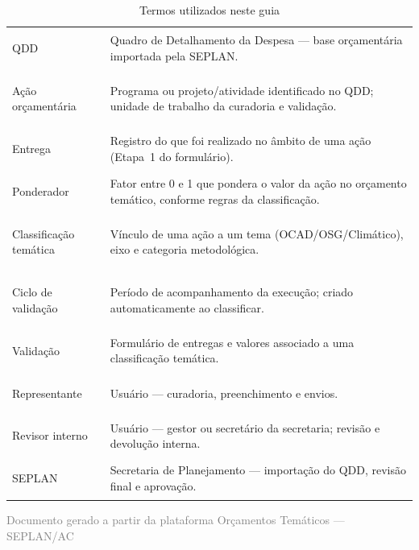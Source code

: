 \documentclass[11pt,a4paper]{article}
\begin{document}
\begin{table}[htbp]
  \centering
  \guiaTableStretch
  \caption{Termos utilizados neste guia}
  \begin{tabularx}{\textwidth}{@{}>{\bfseries\raggedright\arraybackslash}p{4.6cm} Y@{}}
    \toprule
    QDD & Quadro de Detalhamento da Despesa --- base orçamentária importada pela SEPLAN. \\
    Ação orçamentária & Programa ou projeto/atividade identificado no QDD; unidade de trabalho da curadoria e validação. \\
    Entrega & Registro do que foi realizado no âmbito de uma ação (Etapa~1 do formulário). \\
    Ponderador & Fator entre 0 e 1 que pondera o valor da ação no orçamento temático, conforme regras da classificação. \\
    Classificação temática & Vínculo de uma ação a um tema (OCAD/OSG/Climático), eixo e categoria metodológica. \\
    Ciclo de validação & Período de acompanhamento da execução; criado automaticamente ao classificar. \\
    Validação & Formulário de entregas e valores associado a uma classificação temática. \\
    Representante & Usuário  --- curadoria, preenchimento e envios. \\
    Revisor interno & Usuário  --- gestor ou secretário da secretaria; revisão e devolução interna. \\
    SEPLAN & Secretaria de Planejamento --- importação do QDD, revisão final e aprovação. \\
    \bottomrule
  \end{tabularx}
\end{table}

\vfill
\begin{center}
  \small\textcolor{gray}{Documento gerado a partir da plataforma Orçamentos Temáticos — SEPLAN/AC}
\end{center}
\end{document}
